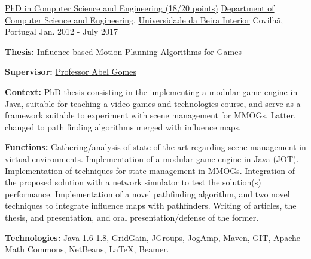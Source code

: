 

\begin{cventries}

  \cventry
    {\href{https://www.ubi.pt/en/course/849}{PhD in Computer Science and Engineering (18/20 points)}} %
    {\href{https://www.di.ubi.pt/}{Department of Computer Science and Engineering}, \href{http://www.ubi.pt/}{Universidade da Beira Interior}} %
    {Covilh\~{a}, Portugal} %
    {Jan. 2012 - July 2017} %
    {
      \begin{cvitems} %
        \item {\textbf{Thesis:} Influence-based Motion Planning Algorithms for Games}
        \item {\textbf{Supervisor:} \href{http://www.di.ubi.pt/~agomes/}{Professor Abel Gomes}}
        \item {\textbf{Context:} PhD thesis consisting in the implementing a modular game engine in Java, suitable for teaching a video games and technologies course, and serve as a framework suitable to experiment with scene management for MMOGs. Latter, changed to path finding algorithms merged with influence maps.}
        \item {\textbf{Functions:} Gathering/analysis of state-of-the-art regarding scene management in virtual environments. Implementation of a modular game engine in Java (JOT). Implementation of techniques for state management in MMOGs. Integration of the proposed solution with a network simulator to test the solution(s) performance. Implementation of a novel pathfinding algorithm, and two novel techniques to integrate influence maps with pathfinders. Writing of articles, the thesis, and presentation, and oral presentation/defense of the former.}
        \item {\textbf{Technologies:} Java 1.6-1.8, GridGain, JGroups, JogAmp, Maven, GIT, Apache Math Commons, NetBeans, %
LaTeX, Beamer.} %
      \end{cvitems}
    }


\end{cventries}
